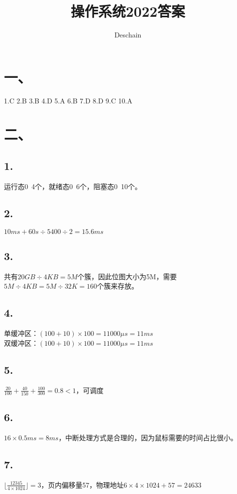 \documentclass[UTF8]{ctexart}
\title{操作系统2022答案}
\author{Deschain}
\begin{document}
\maketitle
\section*{一、}
1.C 2.B 3.B 4.D 5.A 6.B 7.D 8.D 9.C 10.A \\
\section*{二、}
\subsection*{1.}
运行态0~4个，就绪态0~6个，阻塞态0~10个。\\
\subsection*{2.}
$10ms+60s\div 5400\div 2=15.6ms$\\
\subsection*{3.}
共有$20GB\div 4KB=5M$个簇，因此位图大小为5M，需要$5M\div 4KB=5M\div 32K=160$个簇来存放。\\
\subsection*{4.}
单缓冲区：$(100+10)\times 100=11000\mu s=11ms$\\
双缓冲区：$(100+10)\times 100=11000\mu s=11ms$\\
\subsection*{5.}
$\frac{20}{100}+\frac{40}{150}+\frac{100}{300}=0.8<1$，可调度\\
\subsection*{6.}
$16\times 0.5ms=8ms$，中断处理方式是合理的，因为鼠标需要的时间占比很小。\\
\subsection*{7.}
$\lfloor \frac{12345}{4\times 1024} \rfloor = 3 $，页内偏移量57，物理地址$6\times 4\times 1024+57=24633$\\
\end{document}
